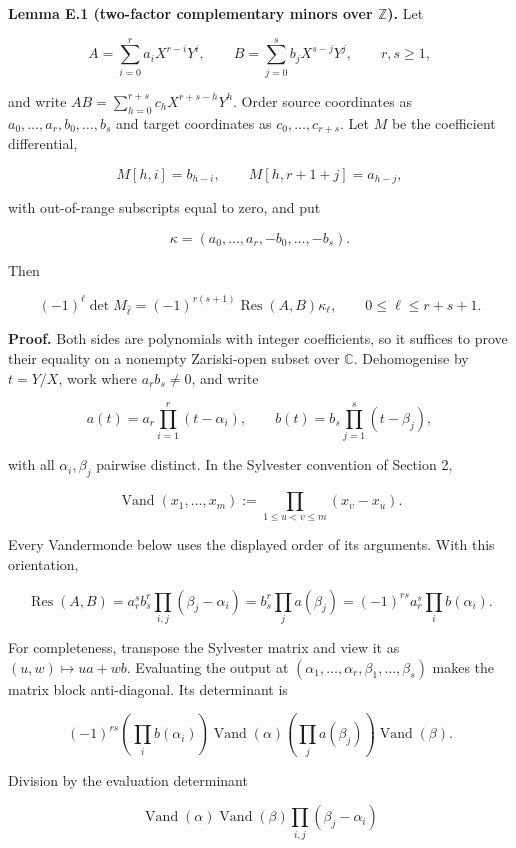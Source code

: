 \documentclass[
  11pt,
  a4paper,
]{article}
\newcounter{none} %
\begin{document}
\textbf{Lemma E.1 (two-factor complementary minors over \(\mathbb Z\)).}
Let

\[
 A=\sum_{i=0}^{r}a_iX^{r-i}Y^i,\qquad
 B=\sum_{j=0}^{s}b_jX^{s-j}Y^j,
 \qquad r,s\ge1,
\]

and write \(AB=\sum_{h=0}^{r+s}c_hX^{r+s-h}Y^h\). Order source
coordinates as \(a_0,\ldots,a_r,b_0,\ldots,b_s\) and target coordinates
as \(c_0,\ldots,c_{r+s}\). Let \(M\) be the coefficient differential,

\[
 M[h,i]=b_{h-i},\qquad
 M[h,r+1+j]=a_{h-j},
\]

with out-of-range subscripts equal to zero, and put

\[
 \kappa=(a_0,\ldots,a_r,-b_0,\ldots,-b_s).
\]

Then

\[
 \boxed{
 (-1)^\ell\det M_{\widehat\ell}
 =(-1)^{r(s+1)}\operatorname{Res}(A,B)\kappa_\ell,
 \qquad 0\le\ell\le r+s+1.
 }
\tag{E.1}
\]

\textbf{Proof.} Both sides are polynomials with integer coefficients, so
it suffices to prove their equality on a nonempty Zariski-open subset
over \(\mathbb C\). Dehomogenise by \(t=Y/X\), work where
\(a_rb_s\ne0\), and write

\[
 a(t)=a_r\prod_{i=1}^{r}(t-\alpha_i),\qquad
 b(t)=b_s\prod_{j=1}^{s}(t-\beta_j),
\]

with all \(\alpha_i,\beta_j\) pairwise distinct. In the Sylvester
convention of Section 2,

\[
 \operatorname{Vand}(x_1,\ldots,x_m)
 :=\prod_{1\le u<v\le m}(x_v-x_u).
\]

Every Vandermonde below uses the displayed order of its arguments. With
this orientation,

\[
 \operatorname{Res}(A,B)
 =a_r^sb_s^r\prod_{i,j}(\beta_j-\alpha_i)
 =b_s^r\prod_j a(\beta_j)
 =(-1)^{rs}a_r^s\prod_i b(\alpha_i).
\tag{E.2}
\]

For completeness, transpose the Sylvester matrix and view it as
\((u,w)\mapsto ua+wb\). Evaluating the output at
\((\alpha_1,\ldots,\alpha_r,\beta_1,\ldots,\beta_s)\) makes the matrix
block anti-diagonal. Its determinant is

\[
 (-1)^{rs}
 \left(\prod_i b(\alpha_i)\right)\operatorname{Vand}(\alpha)
 \left(\prod_j a(\beta_j)\right)\operatorname{Vand}(\beta).
\]

Division by the evaluation determinant

\[
 \operatorname{Vand}(\alpha)\operatorname{Vand}(\beta)
 \prod_{i,j}(\beta_j-\alpha_i)
\]
\end{document}
